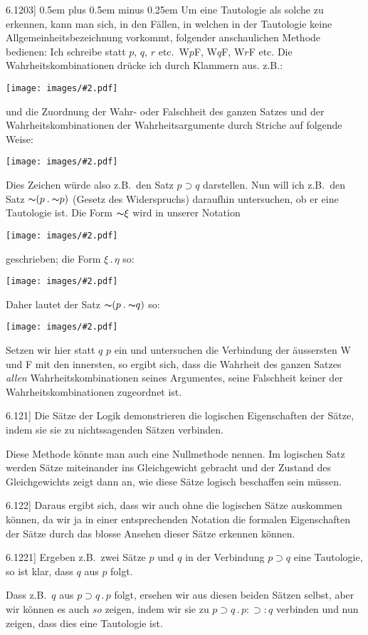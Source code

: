 \documentclass[12pt,oneside]{book}[2007/10/19]
\newcommand{\PropERef}[1]{\hyperref[PropE:#1]{#1}}
\newcommand{\PropositionG}[2]{%
  \item[\phantomsection\label{PropG:#1}\PropERef{#1}] #2%
}
\newcommand{\Illustration}[2][0.3\textwidth]{%
  \begin{center}
  \texttt{[image: images/\#2.pdf]}
  \end{center}
}
\newcommand{\DPtypo}[2]{#2}
\newcommand{\Not}[1]{\mathord{\thicksim} #1}
\newcommand{\DotOp}{\mathbin{.}}
\newcommand{\Implies}{\supset}
\newcommand{\Emph}[1]{\emph{#1}}%
\newcommand{\zumBeispiel}{z.\;B.}
\newcommand{\verystretchyspace}{\spaceskip0.5em plus 0.5em minus 0.25em}
\begin{document}
\begin{propositions}
\PropositionG{6.1203}
{{\verystretchyspace
Um eine Tautologie als solche zu erkennen,
kann man sich, in den Fällen, in welchen in der
Tautologie keine Allgemeinheitsbezeichnung vorkommt,
folgender anschaulichen Methode bedienen:
Ich schreibe statt \glqq{}$p$\grqq{}, \glqq{}$q$\grqq{}, \glqq{}$r$\grqq{} etc.\ \glqq{}W$p$F\grqq{},
\glqq{}W$q$F\grqq{}, \glqq{}W$r$F\grqq{} etc. Die Wahrheitskombinationen
drücke ich durch Klammern aus.
\zumBeispiel:}
\Illustration[0.35\textwidth]{brackets01-de}
und die Zuordnung der Wahr- oder Falschheit des
ganzen Satzes und der Wahrheitskombinationen
der Wahrheitsargumente durch Striche auf
folgende Weise:
\Illustration[0.4\textwidth]{brackets02-de}
Dies Zeichen würde also \zumBeispiel\ den Satz $p \Implies q$
darstellen. Nun will ich \zumBeispiel\ den Satz $\Not{(p \DotOp \Not{p})}$
(Gesetz des Widerspruchs) daraufhin untersuchen,
ob er eine Tautologie ist. Die Form \glqq{}$\Not{\xi}$\grqq{} wird
in unserer Notation
\Illustration[0.1\textwidth]{brackets03-de}
geschrieben; die Form \glqq{}$\xi \DotOp \eta$\grqq{} so:
\Illustration[0.4\textwidth]{brackets04-de}
Daher lautet der Satz $\Not{(p \DotOp \Not{q})}$ so:
\Illustration{brackets05-de}
Setzen wir hier statt \glqq{}$q$\grqq{} \glqq{}$p$\grqq{} ein und untersuchen
die Verbindung der äussersten W und F mit den
innersten, so ergibt sich, dass die Wahrheit des
ganzen Satzes \Emph{allen} Wahrheitskombinationen
seines Argumentes, seine Falschheit keiner der
Wahrheitskombinationen zugeordnet ist.}


\PropositionG{6.121}
{Die Sätze der Logik demonstrieren die logischen
Eigenschaften der Sätze, indem sie sie zu nichtssagenden
Sätzen verbinden.

Diese Methode könnte man auch eine Nullmethode
nennen. Im logischen Satz werden Sätze
miteinander ins Gleichgewicht gebracht und der
Zustand des Gleichgewichts zeigt dann an, wie
diese Sätze logisch beschaffen sein müssen.}


\PropositionG{6.122}
{Daraus ergibt sich, dass wir auch ohne die
logischen Sätze auskommen können, da wir ja in
einer entsprechenden Notation die formalen Eigenschaften
der Sätze durch das blosse Ansehen dieser
Sätze erkennen können.}


\PropositionG{6.1221}
{Ergeben \zumBeispiel\ zwei Sätze \glqq{}$p$\grqq{} und \glqq{}$q$\grqq{} in der
Verbindung \glqq{}$p \Implies q$\grqq{} eine Tautologie, so ist \DPtypo{kar}{klar},
dass $q$ aus $p$ folgt.

Dass \zumBeispiel\ \glqq{}$q$\grqq{} aus \glqq{}$p \Implies q \DotOp p$\grqq{} folgt, ersehen wir
aus diesen beiden Sätzen selbst, aber wir können
es auch \Emph{so} zeigen, indem wir sie zu \glqq{}$p \Implies q \DotOp p : \Implies : q$\grqq{}
verbinden und nun zeigen, dass dies eine Tautologie
ist.}



\end{propositions}
\end{document}

